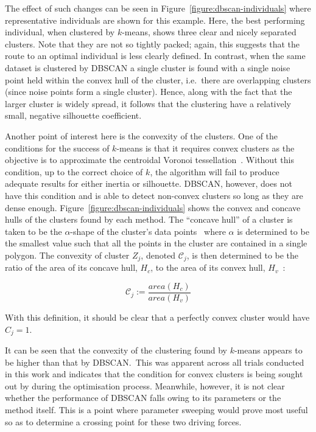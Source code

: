 The effect of such changes can be seen in Figure~\ref{figure:dbscan-individuals}
where representative individuals are shown for this example. Here, the best
performing individual, when clustered by \(k\)-means, shows three clear and
nicely separated clusters. Note that they are not so tightly packed; again, this
suggests that the route to an optimal individual is less clearly defined. In
contrast, when the same dataset is clustered by DBSCAN a single cluster is found
with a single noise point held within the convex hull of the cluster, i.e.\
there are overlapping clusters (since noise points form a single cluster).
Hence, along with the fact that the larger cluster is widely spread, it follows
that the clustering have a relatively small, negative silhouette coefficient.

Another point of interest here is the convexity of the clusters. One of the
conditions for the success of \(k\)-means is that it requires convex clusters as
the objective is to approximate the centroidal Voronoi
tessellation~\cite{Du2006}. Without this condition, up to the correct choice of
\(k\), the algorithm will fail to produce adequate results for either inertia or
silhouette. DBSCAN, however, does not have this condition and is able to detect
non-convex clusters so long as they are dense enough.
Figure~\ref{figure:dbscan-individuals} shows the convex and concave hulls of the
clusters found by each method. The ``concave hull'' of a cluster is taken to be
the \(\alpha\)-shape of the cluster's data points~\cite{Edelsbrunner1983} where
\(\alpha\) is determined to be the smallest value such that all the points in
the cluster are contained in a single polygon. The convexity of cluster \(Z_j\),
denoted \(\mathcal{C}_j\), is then determined to be the ratio of the area of its
concave hull, \(H_c\), to the area of its convex hull, \(H_v\)~\cite{Sonka1993}:

\begin{equation}
    \mathcal{C}_j := \frac{area(H_c)}{area(H_v)}
\end{equation}

With this definition, it should be clear that a perfectly convex cluster would
have \(C_j = 1\).

It can be seen that the convexity of the clustering found by \(k\)-means appears
to be higher than that by DBSCAN.\ This was apparent across all trials conducted
in this work and indicates that the condition for convex clusters is being
sought out by during the optimisation process. Meanwhile, however, it is not
clear whether the performance of DBSCAN falls owing to its parameters or the
method itself. This is a point where parameter sweeping would prove most useful
so as to determine a crossing point for these two driving forces.

